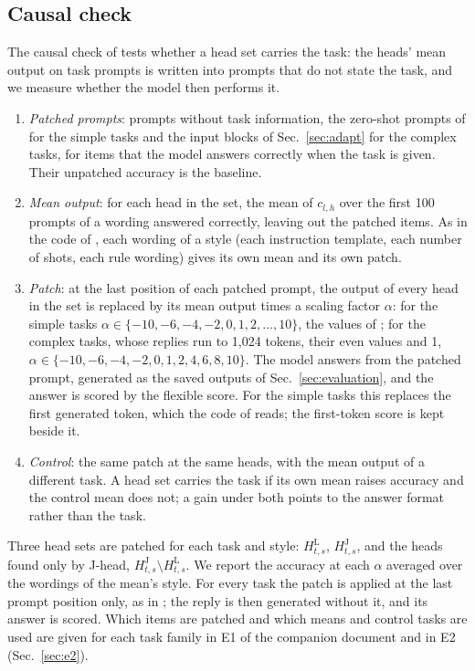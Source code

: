 \documentclass[11pt,a4paper]{article}
\begin{document}
\subsection{Causal check}\label{sec:causal}
The causal check of \citet[Sec.~2.3.2, App.~G]{yang2026shared} tests whether a head set carries the task: the heads' mean output on task prompts is written into prompts that do not state the task, and we measure whether the model then performs it.
\begin{enumerate}
\item \emph{Patched prompts}: prompts without task information, the zero-shot prompts of \citet{yang2026shared} for the simple tasks and the input blocks of Sec.~\ref{sec:adapt} for the complex tasks, for items that the model answers correctly when the task is given. Their unpatched accuracy is the baseline.
\item \emph{Mean output}: for each head in the set, the mean of $c_{l,h}$ over the first 100 prompts of a wording answered correctly, leaving out the patched items. As in the code of \citet{yang2026shared}, each wording of a style (each instruction template, each number of shots, each rule wording) gives its own mean and its own patch.
\item \emph{Patch}: at the last position of each patched prompt, the output of every head in the set is replaced by its mean output times a scaling factor $\alpha$: for the simple tasks $\alpha\in\{-10,-6,-4,-2,0,1,2,\dots,10\}$, the values of \citet{yang2026shared}; for the complex tasks, whose replies run to 1,024 tokens, their even values and 1, $\alpha\in\{-10,-6,-4,-2,0,1,2,4,6,8,10\}$. The model answers from the patched prompt, generated as the saved outputs of Sec.~\ref{sec:evaluation}, and the answer is scored by the flexible score. For the simple tasks this replaces the first generated token, which the code of \citet{yang2026shared} reads; the first-token score is kept beside it.
\item \emph{Control}: the same patch at the same heads, with the mean output of a different task. A head set carries the task if its own mean raises accuracy and the control mean does not; a gain under both points to the answer format rather than the task.
\end{enumerate}
Three head sets are patched for each task and style: $H^{\mathrm{L}}_{t,s}$, $H^{\mathrm{J}}_{t,s}$, and the heads found only by J-head, $H^{\mathrm{J}}_{t,s}\setminus H^{\mathrm{L}}_{t,s}$. We report the accuracy at each $\alpha$ averaged over the wordings of the mean's style.
For every task the patch is applied at the last prompt position only, as in \citet{yang2026shared}; the reply is then generated without it, and its answer is scored.
Which items are patched and which means and control tasks are used are given for each task family in E1 of the companion document and in E2 (Sec.~\ref{sec:e2}).
\end{document}

